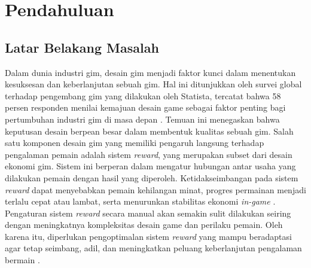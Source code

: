 \chapter{Pendahuluan}\label{ch:introduction}

\section{Latar Belakang Masalah}\label{sec:background}

Dalam dunia industri gim, desain gim menjadi faktor kunci dalam menentukan kesuksesan dan keberlanjutan sebuah gim. Hal ini ditunjukkan oleh survei global terhadap pengembang gim yang dilakukan oleh Statista, tercatat bahwa 58 persen responden menilai kemajuan desain game sebagai faktor penting bagi pertumbuhan industri gim di masa depan \citep{IGDA2019}. Temuan ini menegaskan bahwa keputusan desain berpean besar dalam membentuk kualitas sebuah gim. Salah satu komponen desain gim yang memiliki pengaruh langsung terhadap pengalaman pemain adalah sistem \textit{reward}, yang merupakan subset dari desain ekonomi gim. Sistem ini berperan dalam mengatur hubungan antar usaha yang dilakukan pemain dengan hasil yang diperoleh. Ketidakseimbangan pada sistem \textit{reward} dapat menyebabkan pemain kehilangan minat, progres permainan menjadi terlalu cepat atau lambat, serta menurunkan stabilitas ekonomi \textit{in-game} \citep{Holmberg2021}. Pengaturan sistem \textit{reward} secara manual akan semakin sulit dilakukan seiring dengan meningkatnya kompleksitas desain game dan perilaku pemain. Oleh karena itu, diperlukan pengoptimalan sistem \textit{reward} yang mampu beradaptasi agar tetap seimbang, adil, dan meningkatkan peluang keberlanjutan pengalaman bermain \citep{Rupp_2024}.

